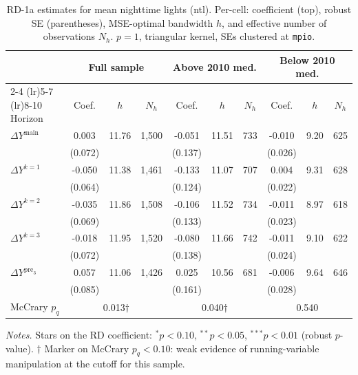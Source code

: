 \documentclass[11pt]{article}
\begin{document}
\begin{table}[H]
\centering
\scriptsize
\caption{RD-1a estimates for mean nighttime lights (ntl). Per-cell: coefficient
(top), robust SE (parentheses), MSE-optimal bandwidth $h$, and
effective number of observations $N_h$. $p=1$, triangular kernel,
SEs clustered at \texttt{mpio}.}
\label{tab:rdplot_rd1a_mean_night}
\begin{tabular}{l ccc ccc ccc}
\toprule
 & \multicolumn{3}{c}{Full sample} & \multicolumn{3}{c}{Above 2010 med.} & \multicolumn{3}{c}{Below 2010 med.} \\
\cmidrule(lr){2-4} \cmidrule(lr){5-7} \cmidrule(lr){8-10}
Horizon & Coef. & $h$ & $N_h$ & Coef. & $h$ & $N_h$ & Coef. & $h$ & $N_h$ \\
\midrule
$\Delta Y^{\text{main}}$ & 0.003 & 11.76 & 1,500 & -0.051 & 11.51 & 733 & -0.010 & 9.20 & 625 \\
 & (0.072) &  &  & (0.137) &  &  & (0.026) &  &  \\
\addlinespace[1pt]
$\Delta Y^{k=1}$ & -0.050 & 11.38 & 1,461 & -0.133 & 11.07 & 707 & 0.004 & 9.31 & 628 \\
 & (0.064) &  &  & (0.124) &  &  & (0.022) &  &  \\
\addlinespace[1pt]
$\Delta Y^{k=2}$ & -0.035 & 11.86 & 1,508 & -0.106 & 11.52 & 734 & -0.011 & 8.97 & 618 \\
 & (0.069) &  &  & (0.133) &  &  & (0.023) &  &  \\
\addlinespace[1pt]
$\Delta Y^{k=3}$ & -0.018 & 11.95 & 1,520 & -0.080 & 11.66 & 742 & -0.011 & 9.10 & 622 \\
 & (0.072) &  &  & (0.138) &  &  & (0.024) &  &  \\
\addlinespace[1pt]
$\Delta Y^{\text{pre}_3}$ & 0.057 & 11.06 & 1,426 & 0.025 & 10.56 & 681 & -0.006 & 9.64 & 646 \\
 & (0.085) &  &  & (0.161) &  &  & (0.028) &  &  \\
\addlinespace[1pt]
\midrule
McCrary $p_q$ & \multicolumn{3}{c}{0.013$\dagger$} & \multicolumn{3}{c}{0.040$\dagger$} & \multicolumn{3}{c}{0.540} \\
\bottomrule
\end{tabular}
\begin{flushleft}\footnotesize
\textit{Notes.} Stars on the RD coefficient: $^{*}p<0.10$,
$^{**}p<0.05$, $^{***}p<0.01$ (robust $p$-value).
$\dagger$ Marker on McCrary $p_q<0.10$: weak evidence of running-variable manipulation at the cutoff for this sample.\\
\end{flushleft}
\end{table}
\end{document}
